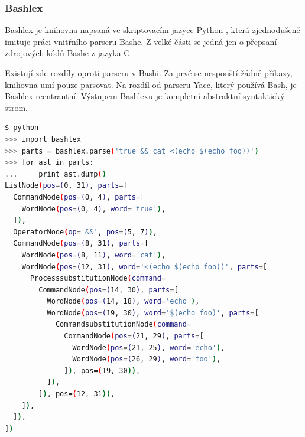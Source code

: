 \documentclass[thesis=M,czech]{FITthesis}[2012/06/26]
\begin{document}





%
%
%
\subsubsection{Bashlex}\label{sec:bashlex}

Bashlex je knihovna napsaná ve skriptovacím jazyce Python \cite{Python}, která zjednodušeně imituje práci vnitřního parseru Bashe. Z velké části se jedná jen o přepsaní zdrojových kódů Bashe z jazyka C.

Existují zde rozdíly oproti parseru v Bashi. Za prvé se nespouští žádné příkazy, knihovna umí pouze parsovat. Na rozdíl od parseru Yacc, který používá Bash, je Bashlex reentrantní. Výstupem Bashlexu je kompletní abstraktní syntaktický strom.

\begin{minipage}{\linewidth}
\begin{lstlisting}[language=bash, caption={Výstup z knihovny Bashlex}, label={lst:bashlex}]
$ python
>>> import bashlex
>>> parts = bashlex.parse('true && cat <(echo $(echo foo))')
>>> for ast in parts:
...     print ast.dump()
ListNode(pos=(0, 31), parts=[
  CommandNode(pos=(0, 4), parts=[
    WordNode(pos=(0, 4), word='true'),
  ]),
  OperatorNode(op='&&', pos=(5, 7)),
  CommandNode(pos=(8, 31), parts=[
    WordNode(pos=(8, 11), word='cat'),
    WordNode(pos=(12, 31), word='<(echo $(echo foo))', parts=[
      ProcesssubstitutionNode(command=
        CommandNode(pos=(14, 30), parts=[
          WordNode(pos=(14, 18), word='echo'),
          WordNode(pos=(19, 30), word='$(echo foo)', parts=[
            CommandsubstitutionNode(command=
              CommandNode(pos=(21, 29), parts=[
                WordNode(pos=(21, 25), word='echo'),
                WordNode(pos=(26, 29), word='foo'),
              ]), pos=(19, 30)),
          ]),
        ]), pos=(12, 31)),
    ]),
  ]),
])
\end{lstlisting}
\end{minipage}

\end{document}
